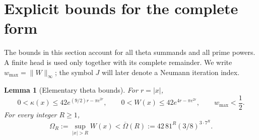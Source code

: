 \documentclass[11pt,a4paper]{article}
\numberwithin{equation}{section}
\newtheorem{lemma}[theorem]{Lemma}
\theoremstyle{remark}
\newcommand{\norm}[1]{\lVert #1\rVert}
\begin{document}
\section{Explicit bounds for the complete form}\label{sec:prime}

The bounds in this section account for all theta summands and all prime powers. A finite head is used only together with its complete remainder. We write $w_{\max}=\norm W_\infty$; the symbol $J$ will later denote a Neumann iteration index.

\begin{lemma}[Elementary theta bounds]\label{lem:explicitW}
For $r=|x|$,
\begin{equation}\label{eq:explicit_envelope}
 0<\kappa(x)\le42e^{(9/2)r-\pi e^{2r}},\qquad
 0<W(x)\le42e^{4r-\pi e^{2r}},\qquad w_{\max}<\frac12.
\end{equation}
For every integer $R\ge1$,
\begin{equation}\label{eq:rationalOmega}
 \Omega_R:=\sup_{|x|>R}W(x)
 <\overline\Omega(R):=42\,81^R(3/8)^{3\cdot7^R}.
\end{equation}
\end{lemma}
\end{document}

